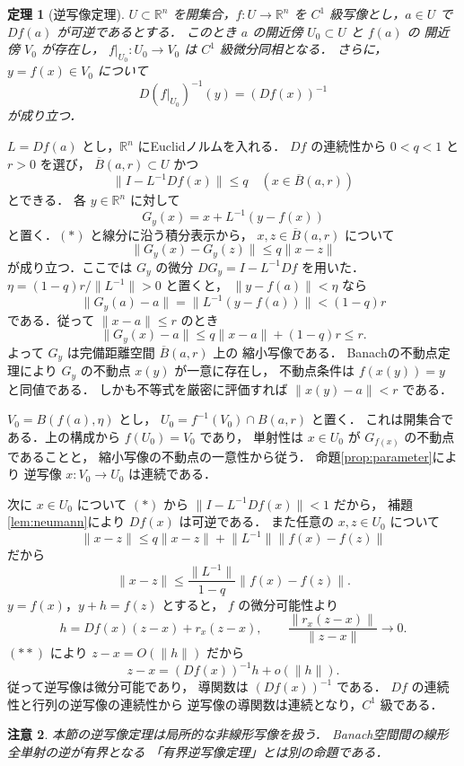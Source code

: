 \documentclass[a5paper,10pt,onecolumn]{jsarticle}
\makeatletter
\theoremstyle{mathnotetheorem}
\newtheorem{theorem}{定理}[section]
\newtheorem{remark}[theorem]{注意}
\renewcommand{\proofname}{証明}
\renewenvironment{proof}[1][\proofname]{%
  \par\pushQED{\qed}\normalfont\topsep4\p@\@plus2\p@\relax
  \trivlist\item[\hskip\labelsep\bfseries #1]\ignorespaces
}{\popQED\endtrivlist\@endpefalse}
\newcommand{\R}{\mathbb{R}}
\newcommand{\norm}[1]{\lVert #1\rVert}
\makeatother
\begin{document}
\begin{theorem}[逆写像定理]\label{thm:inverse}
$U\subset\R^n$ を開集合，$f:U\to\R^n$ を
$C^1$ 級写像とし，$a\in U$ で $Df(a)$ が可逆であるとする．
このとき $a$ の開近傍 $U_0\subset U$ と $f(a)$ の
開近傍 $V_0$ が存在し，
$f|_{U_0}:U_0\to V_0$ は $C^1$ 級微分同相となる．
さらに，$y=f(x)\in V_0$ について
\[
 D(f|_{U_0})^{-1}(y)=(Df(x))^{-1}
\]
が成り立つ．
\end{theorem}
\begin{proof}
$L=Df(a)$ とし，$\R^n$ にEuclidノルムを入れる．
$Df$ の連続性から $0<q<1$ と $r>0$ を選び，
$\overline{B}(a,r)\subset U$ かつ
\[
 \norm{I-L^{-1}Df(x)}\le q
 \quad(x\in\overline{B}(a,r))
 \tag{$*$}
\]
とできる．
各 $y\in\R^n$ に対して
\[
 G_y(x)=x+L^{-1}(y-f(x))
\]
と置く．$(*)$ と線分に沿う積分表示から，
$x,z\in\overline{B}(a,r)$ について
\[
 \norm{G_y(x)-G_y(z)}
 \le q\norm{x-z}
\]
が成り立つ．ここでは $G_y$ の微分
$DG_y=I-L^{-1}Df$ を用いた．
$\eta=(1-q)r/\norm{L^{-1}}>0$ と置くと，
$\norm{y-f(a)}<\eta$ なら
\[
 \norm{G_y(a)-a}=\norm{L^{-1}(y-f(a))}
 <(1-q)r
\]
である．従って $\norm{x-a}\le r$ のとき
\[
 \norm{G_y(x)-a}
 \le q\norm{x-a}+(1-q)r\le r.
\]
よって $G_y$ は完備距離空間 $\overline{B}(a,r)$ 上の
縮小写像である．
Banachの不動点定理により $G_y$ の不動点 $x(y)$ が一意に存在し，
不動点条件は $f(x(y))=y$ と同値である．
しかも不等式を厳密に評価すれば
$\norm{x(y)-a}<r$ である．

$V_0=B(f(a),\eta)$ とし，
$U_0=f^{-1}(V_0)\cap B(a,r)$ と置く．
これは開集合である．上の構成から $f(U_0)=V_0$ であり，
単射性は $x\in U_0$ が $G_{f(x)}$ の不動点であることと，
縮小写像の不動点の一意性から従う．
命題\ref{prop:parameter}により
逆写像 $x:V_0\to U_0$ は連続である．

次に $x\in U_0$ について
$(*)$ から
$\norm{I-L^{-1}Df(x)}<1$ だから，
補題\ref{lem:neumann}により $Df(x)$ は可逆である．
また任意の $x,z\in U_0$ について
\[
 \norm{x-z}
 \le q\norm{x-z}+\norm{L^{-1}}\norm{f(x)-f(z)}
\]
だから
\[
 \norm{x-z}\le\frac{\norm{L^{-1}}}{1-q}
 \norm{f(x)-f(z)}.
 \tag{$**$}
\]
$y=f(x)$，$y+h=f(z)$ とすると，
$f$ の微分可能性より
\[
 h=Df(x)(z-x)+r_x(z-x),\qquad
 \frac{\norm{r_x(z-x)}}{\norm{z-x}}\longrightarrow0.
\]
$(**)$ により $z-x=O(\norm h)$ だから
\[
 z-x=(Df(x))^{-1}h+o(\norm h).
\]
従って逆写像は微分可能であり，
導関数は $(Df(x))^{-1}$ である．
$Df$ の連続性と行列の逆写像の連続性から
逆写像の導関数は連続となり，$C^1$ 級である．
\end{proof}

\begin{remark}
本節の逆写像定理は局所的な非線形写像を扱う．
Banach空間間の線形全単射の逆が有界となる
「有界逆写像定理」とは別の命題である．
\end{remark}
\end{document}
